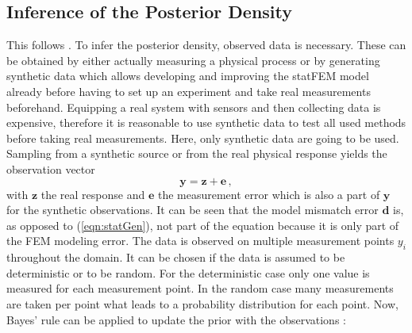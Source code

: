 \documentclass[%
  a4paper,oneside,%
  11pt,%
  smallchapters,
  style=printdev,
  extramargin,
  green,%
  rgb, <cmyk>
  ]{tubsbook}
\begin{document}
\subsection{Inference of the Posterior Density}
This follows \cite[p.10 ff.]{girolami2021}.
To infer the posterior density, observed data is necessary. These can be obtained by either actually measuring a physical process or by generating synthetic data which allows developing and improving the statFEM model already before having to set up an experiment and take real measurements beforehand. Equipping a real system with sensors and then collecting data is expensive, therefore it is reasonable to use synthetic data to test all used methods before taking real measurements. Here, only synthetic data are going to be used.
%
Sampling from a synthetic source or from the real physical response yields the observation vector
%
\begin{equation}
\bm{y} = \bm{z} + \bm{e} \, ,
\end{equation}
%
with $\bm{z}$ the real response and $\bm{e}$ the measurement error which is also a part of $\bm{y}$ for the synthetic observations. It can be seen that the model mismatch error $\bm{d}$ is, as opposed to (\ref{eqn:statGen}), not part of the equation because it is only part of the FEM modeling error. 
%
The data is observed on multiple measurement points $y_i$ throughout the domain. It can be chosen if the data is assumed to be deterministic or to be random. For the deterministic case only one value is measured for each measurement point. In the random case many measurements are taken per point what leads to a probability distribution for each point.
%
Now, Bayes' rule can be applied to update the prior with the observations \cite{girolami2021}: 
\end{document}
